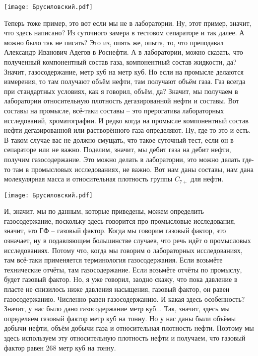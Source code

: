 \documentclass[main.tex]{subfiles}
\begin{document}
\begin{center}
\texttt{[image: Брусиловский.pdf]}
\end{center}

Теперь тоже пример, это вот если мы не в лаборатории.
Ну, этот пример, значит, что здесь написано?
Из суточного замера в тестовом сепараторе и так далее.
А можно было так не писать?
Это из, опять же, опыта, то, что преподавал Александр Иванович Адегов в Роснефти.
А в лаборатории, можно сказать, что полученный компонентный состав газа, компонентный состав жидкости, да?
Значит, газосодержание, метр куб на метр куб.
Но если на промысле делаются измерения, то там получают объём нефти, там получают объём газа.
Газ всегда при стандартных условиях, как я говорил, объём, да?
Значит, мы получаем в лаборатории относительную плотность дегазированной нефти и составы.
Вот составы на промысле, всё-таки составы -- это прерогатива лабораторных исследований, хроматографии.
И редко когда на промысле компонентный состав нефти дегазированной или растворённого газа определяют.
Ну, где-то это и есть.
В таком случае вас не должно смущать, что такое суточный тест, если он в сепараторе или не важно.
Поделим, значит, мы дебит газа на дебит нефти, получим газосодержание.
Это можно делать в лаборатории, это можно делать где-то там в промысловых исследованиях, не важно.
Вот нам даны составы, нам дана молекулярная масса и относительная плотность группы $C_{7+}$ для нефти.

\begin{center}
\texttt{[image: Брусиловский.pdf]}
\end{center}

И, значит, мы по данным, которые приведены, можем определить газосодержание, поскольку здесь говорится про промысловые исследования, значит, это ГФ -- газовый фактор.
Когда мы говорим газовый фактор, это означает, ну в подавляющем большинстве случаев, что речь идёт о промысловых исследованиях.
Потому что, когда мы говорим о лабораторных исследованиях, там всё-таки применяется терминология газосодержания.
Если возьмёте технические отчёты, там газосодержание.
Если возьмёте отчёты по промыслу, будет газовый фактор.
Но, я уже говорил, заодно скажу, что пока давление в пласте не снизилось ниже давления насыщения, газовый фактор, он равен газосодержанию.
Численно равен газосодержанию.
И какая здесь особенность?
Значит, у нас было дано газосодержание метр куб...
Так, значит, здесь мы определяем газовый фактор метр куб на тонну.
Но у нас даны были объёмы добычи нефти, объём добычи газа и относительная плотность нефти.
Поэтому мы здесь используем эту относительную плотность нефти и получаем, что газовый фактор равен 268 метр куб на тонну.
\end{document}
